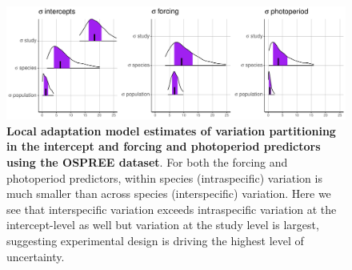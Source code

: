 \documentclass[12pt]{article}
\begin{document}
\begin{figure}[h!]
    \centering
 \includegraphics[width=\textwidth]{..//..//analyses/ranges/figures/variancepartitioning.pdf} 
    \caption{ \textbf{Local adaptation model estimates of variation partitioning in the intercept and forcing and photoperiod predictors using the OSPREE dataset}. For both the forcing and photoperiod predictors, within species (intraspecific) variation is much smaller than across species (interspecific) variation. Here we see that interspecific variation exceeds intraspecific variation at the intercept-level as well but variation at the study level is largest, suggesting experimental design is driving the highest level of uncertainty.}
    \label{fig:popy}
\end{figure}
\end{document}
